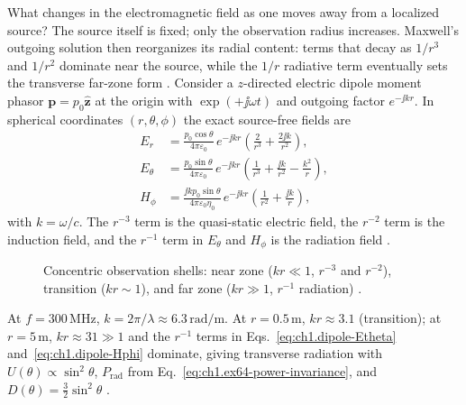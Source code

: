 What changes in the electromagnetic field as one moves away from a localized source? The source itself is fixed; only the observation radius increases. Maxwell's outgoing solution then reorganizes its radial content: terms that decay as $1/r^3$ and $1/r^2$ dominate near the source, while the $1/r$ radiative term eventually sets the transverse far-zone form \cite{stratton1941,poynting1884}. Consider a $z$-directed electric dipole moment phasor $\mathbf{p}=p_0\hat{\mathbf{z}}$ at the origin with $\exp(+\jj\omega t)$ and outgoing factor $e^{-\jj kr}$. In spherical coordinates $(r,\theta,\phi)$ the exact source-free fields are \cite{stratton1941,harrington2001}
\begin{subequations}
\label{eq:ch1.dipole-fields-explicit}
\begin{align}
E_r&=\frac{p_0\cos\theta}{4\pi\varepsilon_0}\,e^{-\jj kr}
\left(\frac{2}{r^3}+\frac{2\jj k}{r^2}\right),
\label{eq:ch1.dipole-Er}\\[0.25em]
E_\theta&=\frac{p_0\sin\theta}{4\pi\varepsilon_0}\,e^{-\jj kr}
\left(\frac{1}{r^3}+\frac{\jj k}{r^2}-\frac{k^2}{r}\right),
\label{eq:ch1.dipole-Etheta}\\[0.25em]
H_\phi&=\frac{\jj k p_0\sin\theta}{4\pi\varepsilon_0\eta_0}\,e^{-\jj kr}
\left(\frac{1}{r^2}+\frac{\jj k}{r}\right),
\label{eq:ch1.dipole-Hphi}
\end{align}
\end{subequations}
with $k=\omega/c$. The $r^{-3}$ term is the quasi-static electric field, the $r^{-2}$
term is the induction field, and the $r^{-1}$ term in $E_\theta$ and $H_\phi$ is the
radiation field \cite{stratton1941}.

\begin{figure}[t]
\centering
\VolIPhysFig{\VolIPhysDipoleThreeZones}
\caption{Concentric observation shells: near zone ($kr\ll1$, $r^{-3}$ and $r^{-2}$), transition ($kr\sim1$), and far zone ($kr\gg1$, $r^{-1}$ radiation) \cite{stratton1941,poynting1884}.}
\label{fig:ch1.dipole-three-zones}
\end{figure}

\begin{example}
\label{ex:ch1.dipole-kr}
At $f=300\,\mathrm{MHz}$, $k=2\pi/\lambda\approx6.3\,\mathrm{rad/m}$. At $r=0.5\,\mathrm{m}$, $kr\approx3.1$ (transition); at $r=5\,\mathrm{m}$, $kr\approx31\gg1$ and the $r^{-1}$ terms in Eqs.~\eqref{eq:ch1.dipole-Etheta} and~\eqref{eq:ch1.dipole-Hphi} dominate, giving transverse radiation with $U(\theta)\propto\sin^2\theta$, $P_{\mathrm{rad}}$ from Eq.~\eqref{eq:ch1.ex64-power-invariance}, and $D(\theta)=\tfrac32\sin^2\theta$ \cite{stratton1941,harrington2001}.
\end{example}

